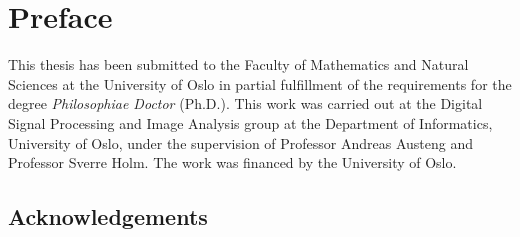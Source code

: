\chapter*{Preface}

This thesis has been submitted to the Faculty of Mathematics and Natural Sciences at the University of Oslo in partial fulfillment of the requirements for the degree \emph{Philosophiae Doctor} (Ph.D.). This work was carried out at the Digital Signal Processing and Image Analysis group at the Department of Informatics, University of Oslo, under the supervision of Professor Andreas Austeng and Professor Sverre Holm. The work was financed by the University of Oslo.

\section*{Acknowledgements}